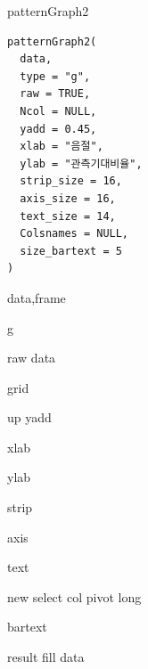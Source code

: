 \documentclass[a4paper]{book}
\begin{document}
%
\begin{Description}
patternGraph2
\end{Description}
%
\begin{Usage}
\begin{verbatim}
patternGraph2(
  data,
  type = "g",
  raw = TRUE,
  Ncol = NULL,
  yadd = 0.45,
  xlab = "음절",
  ylab = "관측기대비율",
  strip_size = 16,
  axis_size = 16,
  text_size = 14,
  Colsnames = NULL,
  size_bartext = 5
)
\end{verbatim}
\end{Usage}
%
\begin{Arguments}
\begin{ldescription}
\item[\code{data}] data,frame

\item[\code{type}] g

\item[\code{raw}] raw data

\item[\code{Ncol}] grid

\item[\code{yadd}] up yadd

\item[\code{xlab}] xlab

\item[\code{ylab}] ylab

\item[\code{strip\_size}] strip

\item[\code{axis\_size}] axis

\item[\code{text\_size}] text

\item[\code{Colsnames}] new select col pivot long

\item[\code{size\_bartext}] bartext
\end{ldescription}
\end{Arguments}
%
\begin{Value}
result fill data
\end{Value}
%
\end{document}
